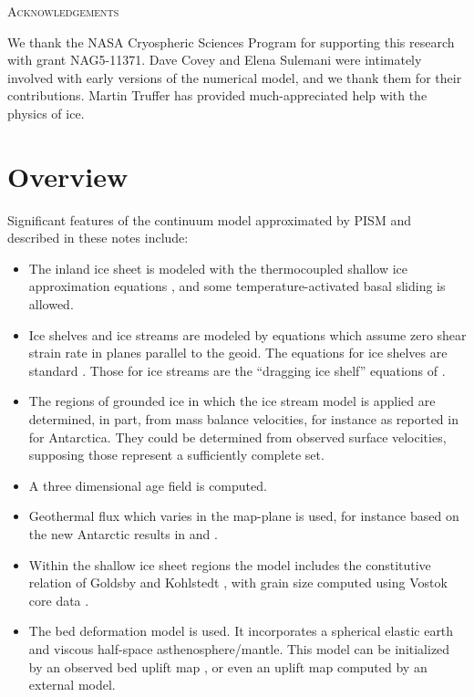 \documentclass[12pt,final]{amsart}%
\theoremstyle{plain}
\theoremstyle{definition}
\theoremstyle{remark}
\begin{document}
\centerline{\textsc{Acknowledgements}}
\bigskip

We thank the NASA Cryospheric Sciences Program for supporting this research with grant NAG5-11371.  Dave Covey and Elena Sulemani were intimately involved with early versions of the numerical model, and we thank them for their contributions.  Martin Truffer has provided much-appreciated help with the physics of ice.


\newpage
\section{Overview}
Significant features of the continuum model approximated by PISM and described in these notes include:\begin{itemize}
\item The inland ice sheet is modeled with the thermocoupled shallow ice approximation equations \citep{Fowler}, and some temperature-activated basal sliding is allowed.
\item Ice shelves and ice streams are modeled by equations which assume zero shear strain rate in planes parallel to the geoid.  The equations for ice shelves are standard \citep{Morland,MorlandZainuddin}.  Those for ice streams are the ``dragging ice shelf'' equations of \citep{MacAyeal,MacAyealetal}.
\item The regions of grounded ice in which the ice stream model is applied are determined, in part, from mass balance velocities, for instance as reported in \citep{BamberVaughanJoughin} for Antarctica.  They could be determined from observed surface velocities, supposing those represent a sufficiently complete set.
\item A three dimensional age field is computed.
\item Geothermal flux which varies in the map-plane is used, for instance based on the new Antarctic results in \citep{ShapiroRitzwoller} and \citep{FoxMaule}.
\item Within the shallow ice sheet regions the model includes the constitutive relation of Goldsby and Kohlstedt \citep{GoldsbyKohlstedt,Peltieretal}, with grain size computed using Vostok core data \citep{VostokCore}.
\item The \citet{LingleClark} bed deformation model is used.  It incorporates a spherical elastic earth and viscous half-space asthenosphere/mantle.  This model can be initialized by an observed bed uplift map \citep{BLKfastearth}, or even an uplift map computed by an external model.\end{itemize}
\end{document}
